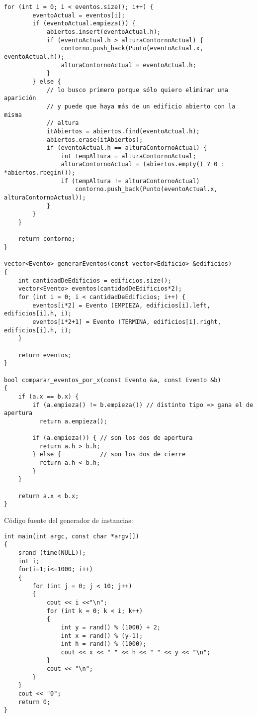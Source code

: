 \begin{lstlisting}[frame=single]
    for (int i = 0; i < eventos.size(); i++) {
        eventoActual = eventos[i];
        if (eventoActual.empieza()) {
            abiertos.insert(eventoActual.h);
            if (eventoActual.h > alturaContornoActual) {
                contorno.push_back(Punto(eventoActual.x, eventoActual.h));
                alturaContornoActual = eventoActual.h;
            }
        } else {
            // lo busco primero porque sólo quiero eliminar una aparición
            // y puede que haya más de un edificio abierto con la misma
            // altura
            itAbiertos = abiertos.find(eventoActual.h); 
            abiertos.erase(itAbiertos);
            if (eventoActual.h == alturaContornoActual) {
                int tempAltura = alturaContornoActual;
                alturaContornoActual = (abiertos.empty() ? 0 : *abiertos.rbegin());
                if (tempAltura != alturaContornoActual)
                    contorno.push_back(Punto(eventoActual.x, alturaContornoActual));
            }
        }
    }
    
    return contorno; 
} 

vector<Evento> generarEventos(const vector<Edificio> &edificios)
{
    int cantidadDeEdificios = edificios.size();
    vector<Evento> eventos(cantidadDeEdificios*2);
    for (int i = 0; i < cantidadDeEdificios; i++) {
        eventos[i*2] = Evento (EMPIEZA, edificios[i].left, edificios[i].h, i);
        eventos[i*2+1] = Evento (TERMINA, edificios[i].right, edificios[i].h, i);
    }
    
    return eventos;
}

bool comparar_eventos_por_x(const Evento &a, const Evento &b)
{
    if (a.x == b.x) {
        if (a.empieza() != b.empieza()) // distinto tipo => gana el de apertura
          return a.empieza();

        if (a.empieza()) { // son los dos de apertura
          return a.h > b.h;
        } else {           // son los dos de cierre
          return a.h < b.h;
        }
    }
    
    return a.x < b.x;
}
\end{lstlisting}

Código fuente del generador de instancias:
\begin{lstlisting}[frame=single]
int main(int argc, const char *argv[])
{
    srand (time(NULL));
    int i;
    for(i=1;i<=1000; i++)
    {
        for (int j = 0; j < 10; j++)
        {
            cout << i <<"\n";
            for (int k = 0; k < i; k++)
            {
                int y = rand() % (1000) + 2;
                int x = rand() % (y-1);
                int h = rand() % (1000);
                cout << x << " " << h << " " << y << "\n";
            }
            cout << "\n";
        }
    }
    cout << "0"; 
    return 0;
}
\end{lstlisting}

